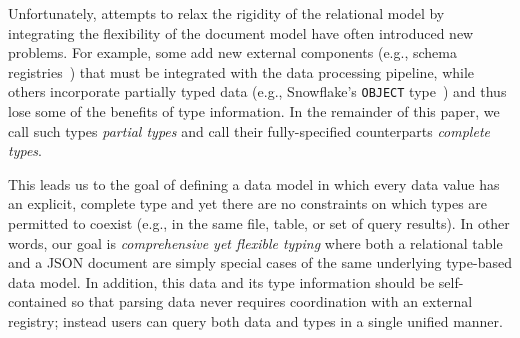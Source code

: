 Unfortunately, attempts to relax the rigidity of the relational model by integrating the flexibility of the document model have often introduced new problems. For example, some add new external components (e.g., schema registries~\cite{confluent_schema_registry}) that must be integrated with the data processing pipeline, while others incorporate partially typed data (e.g., Snowflake's \texttt{OBJECT} type~\cite{snowflake}) and thus lose some of the benefits of type information.  In the remainder of this paper, we call such types {\em partial types} and call their fully-specified counterparts {\em complete types}.

This leads us to the goal of defining a data model in which every data value has an explicit, complete type and yet there are no constraints on which types are permitted to coexist (e.g., in the same file, table, or set of query results). In other words, our goal is {\em comprehensive yet flexible typing} where both a relational table and a JSON document are simply special cases of the same underlying type-based data model.
In addition, this data and its type information should be self-contained so that parsing data never requires coordination with an external registry; instead users can query both data and types in a single unified manner.

